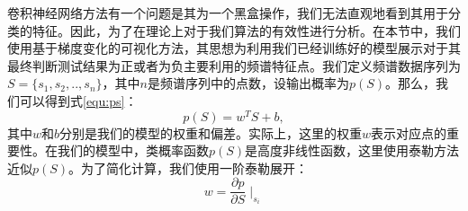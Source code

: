 卷积神经网络方法有一个问题是其为一个黑盒操作，我们无法直观地看到其用于分类的特征。因此，为了在理论上对于我们算法的有效性进行分析。在本节中，我们使用基于梯度变化的可视化方法，其思想为利用我们已经训练好的模型展示对于其最终判断测试结果为正或者为负主要利用的频谱特征点。我们定义频谱数据序列为$ S = \{s_1, s_2, .., s_n\} $，其中$n$是频谱序列中的点数，设输出概率为$p(S)$。那么，我们可以得到式\ref{equ:ps}：
\begin{equation}
p(S) = w^TS+b,
\label{equ:ps}
\end{equation}
其中$ w $和$ b $分别是我们的模型的权重和偏差。实际上，这里的权重$ w $表示对应点的重要性。在我们的模型中，类概率函数$p(S)$是高度非线性函数，这里使用泰勒方法近似$p(S)$。为了简化计算，我们使用一阶泰勒展开：
\begin{equation}
w = \frac{\partial{p}}{\partial{S}}{\mid}_{s_i}
\label{equ:w}
\end{equation}


